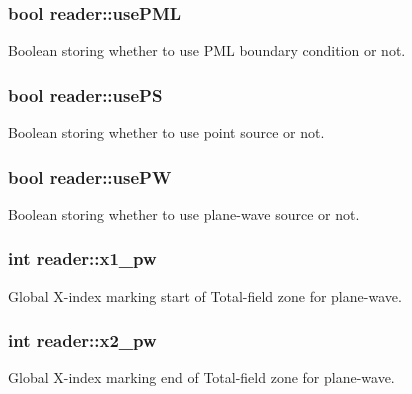 \subsubsection[{\texorpdfstring{use\+P\+ML}{usePML}}]{\setlength{\rightskip}{0pt plus 5cm}bool reader\+::use\+P\+ML}\hypertarget{classreader_a83041337efd59312d3611c445531c5be}{}\label{classreader_a83041337efd59312d3611c445531c5be}
Boolean storing whether to use P\+ML boundary condition or not. 
\subsubsection[{\texorpdfstring{use\+PS}{usePS}}]{\setlength{\rightskip}{0pt plus 5cm}bool reader\+::use\+PS}\hypertarget{classreader_aaefb82848b0d32b29e3a03c949019e91}{}\label{classreader_aaefb82848b0d32b29e3a03c949019e91}
Boolean storing whether to use point source or not. 
\subsubsection[{\texorpdfstring{use\+PW}{usePW}}]{\setlength{\rightskip}{0pt plus 5cm}bool reader\+::use\+PW}\hypertarget{classreader_a64a1149ced0bd0ea1ba3b0818e2ba27a}{}\label{classreader_a64a1149ced0bd0ea1ba3b0818e2ba27a}
Boolean storing whether to use plane-\/wave source or not. 
\subsubsection[{\texorpdfstring{x1\+\_\+pw}{x1_pw}}]{\setlength{\rightskip}{0pt plus 5cm}int reader\+::x1\+\_\+pw}\hypertarget{classreader_aae4d02deaa1be9570b4f76328b6d4c42}{}\label{classreader_aae4d02deaa1be9570b4f76328b6d4c42}
Global X-\/index marking start of Total-\/field zone for plane-\/wave. 
\subsubsection[{\texorpdfstring{x2\+\_\+pw}{x2_pw}}]{\setlength{\rightskip}{0pt plus 5cm}int reader\+::x2\+\_\+pw}\hypertarget{classreader_ad96b0fe356238c79bac21a63dff992f3}{}\label{classreader_ad96b0fe356238c79bac21a63dff992f3}
Global X-\/index marking end of Total-\/field zone for plane-\/wave. 
